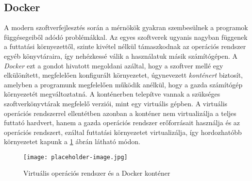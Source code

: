 \subsection{Docker}

A modern szoftverfejlesztés során a mérnökök gyakran szembesülnek a programok függésegeiből adódó problémákkal. Az egyes szoftverek ugyanis nagyban függenek a futtatási környezettől, szinte kivétel nélkül támaszkodnak az operációs rendszer egyéb könyvtáraira, így nehézkessé válik a használatuk másik számítógépen. A \emph{Docker} ezt a gondot hivatott megoldani azáltal, hogy a szoftver mellé egy elkülönített, megfelelően konfigurált környezetet, úgynevezett \emph{konténert} biztosít, amelyben a programunk megfelelően működik anélkül, hogy a gazda számítógép környezetét megváltoztatná. A konténerben telepítve vannak a szükséges szoftverkönyvtárak megfelelő verziói, mint egy virtuális gépben. A virtuális operációs rendszerrel ellentétben azonban a konténer nem virtualizálja a teljes futtató hardvert, hanem a gazda operációs rendszer erőforrásait használja és az operációs rendszert, ezáltal futtatási környezetet virtualizálja, így hordozhatóbb környezetet kapunk a \ref{fig:placeholder_1} ábrán látható módon.

\begin{figure}[h]
\texttt{[image: placeholder-image.jpg]}
\centering
\caption{Virtuális operációs rendszer és a Docker konténer}
\label{fig:placeholder_1}
\end{figure}